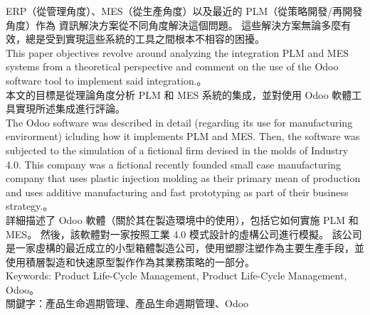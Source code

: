 \fontsize{14pt}{5pt}\sectionef
 {ERP（從管理角度）、MES（從生產角度）以及最近的 PLM（從策略開發/再開發角度）作為
資訊解決方案從不同角度解決這個問題。 這些解決方案無論多麼有效，總是受到實現這些系統的工具之間根本不相容的困擾。}\\[15pt]

\fontsize{14pt}{2.5pt}\sectionef 
{This paper objectives revolve around analyzing the integration PLM and MES systems 
from a theoretical perspective and comment on the use of the Odoo software tool to 
implement said integration.}。\\[1pt]

\fontsize{14pt}{5pt}\sectionef
 {本文的目標是從理論角度分析 PLM 和 MES 系統的集成，並對使用 Odoo 軟體工具實現所述集成進行評論。}\\[15pt]

\fontsize{14pt}{2.5pt}\sectionef 
{The Odoo software was described in detail (regarding its use for manufacturing 
envirorment) icluding how it implements PLM and MES. Then, the software was subjected 
to the simulation of a fictional firm devised in the molds of Industry 4.0. This company was
a fictional recently founded small case manufacturing company that uses plastic injection 
molding as their primary mean of production and uses additive manufacturing and fast 
prototyping as part of their business strategy.}。\\[1pt]

\fontsize{14pt}{5pt}\sectionef
 {詳細描述了 Odoo 軟體（關於其在製造環境中的使用），包括它如何實施 PLM 和 MES。 然後，該軟體對一家按照工業 4.0 模式設計的虛構公司進行模擬。 該公司是一家虛構的最近成立的小型箱體製造公司，使用塑膠注塑作為主要生產手段，並使用積層製造和快速原型製作作為其業務策略的一部分。}\\[15pt]

\fontsize{14pt}{2.5pt}\sectionef 
{Keywords: Product Life-Cycle Management, Product Life-Cycle Management, Odoo}。\\[1pt]

\fontsize{14pt}{5pt}\sectionef
 {關鍵字：產品生命週期管理、產品生命週期管理、Odoo}\\[15pt]
